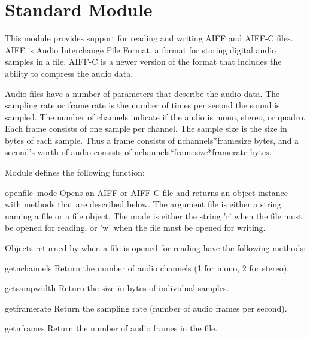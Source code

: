 \section{Standard Module }

This module provides support for reading and writing AIFF and AIFF-C
files.  AIFF is Audio Interchange File Format, a format for storing
digital audio samples in a file.  AIFF-C is a newer version of the
format that includes the ability to compress the audio data.

Audio files have a number of parameters that describe the audio data.
The sampling rate or frame rate is the number of times per second the
sound is sampled.  The number of channels indicate if the audio is
mono, stereo, or quadro.  Each frame consists of one sample per
channel.  The sample size is the size in bytes of each sample.  Thus a
frame consists of nchannels*framesize bytes, and a second's worth of
audio consists of nchannels*framesize*framerate bytes.

Module  defines the following function:

\renewcommand{\indexsubitem}{(in module aifc)}
\begin{funcdesc}{open}{file\, mode}
Opens an AIFF or AIFF-C file and returns an object instance with
methods that are described below.  The argument file is either a
string naming a file or a file object.  The mode is either the string
'r' when the file must be opened for reading, or 'w' when the file
must be opened for writing.
\end{funcdesc}

Objects returned by  when a file is opened for
reading have the following methods:

\renewcommand{\indexsubitem}{(aifc object method)}
\begin{funcdesc}{getnchannels}{}
Return the number of audio channels (1 for mono, 2 for stereo).
\end{funcdesc}

\begin{funcdesc}{getsampwidth}{}
Return the size in bytes of individual samples.
\end{funcdesc}

\begin{funcdesc}{getframerate}{}
Return the sampling rate (number of audio frames per second).
\end{funcdesc}

\begin{funcdesc}{getnframes}{}
Return the number of audio frames in the file.
\end{funcdesc}

